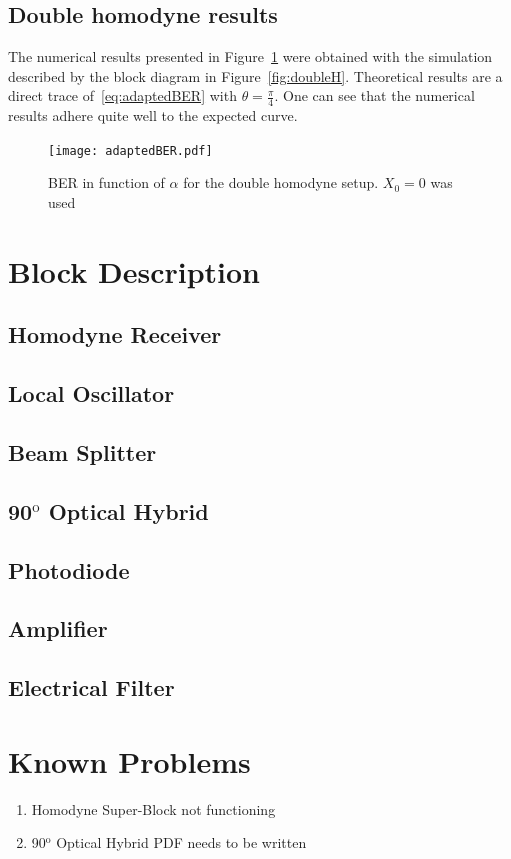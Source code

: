 \subsection{Double homodyne results}\label{subsec:DHresults}

The numerical results presented in Figure~\ref{fig:adaptedber} were obtained with the simulation described by the block diagram in Figure~\ref{fig:doubleH}. Theoretical results are a direct trace of~\eqref{eq:adaptedBER} with $\theta=\frac{\pi}{4}$. One can see that the numerical results adhere quite well to the expected curve.

\begin{figure}[h]
\centering
\texttt{[image: adaptedBER.pdf]}
\caption{BER in function of $\alpha$ for the double homodyne setup. $X_0=0$ was used}
\label{fig:adaptedber}
\end{figure}

\section{Block Description}

\subsection{Homodyne Receiver}


\subsection{Local Oscillator}


\subsection{Beam Splitter}


\subsection{90$^\text{o}$ Optical Hybrid}

\subsection{Photodiode}


\subsection{Amplifier}


\subsection{Electrical Filter}


\section{Known Problems}
\begin{enumerate}
    \item Homodyne Super-Block not functioning
    \item 90$^\text{o}$ Optical Hybrid PDF needs to be written
\end{enumerate}




 